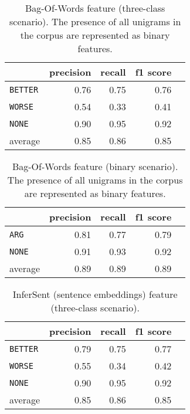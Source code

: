 \begin{table}[htbp] 
	\centering 
	\caption{Bag-Of-Words feature (three-class scenario). The presence of all unigrams in the corpus are represented as binary features.} 
	\begin{tabular}{@{}lrrrr@{}}
		\toprule
		                & precision & recall & f1 score \\ \midrule 
		\texttt{BETTER} & 0.76      & 0.75   & 0.76     \\ 
		\texttt{WORSE}  & 0.54      & 0.33   & 0.41     \\ 
		\texttt{NONE}   & 0.90      & 0.95   & 0.92     \\ 
		average         & 0.85      & 0.86   & 0.85     \\ 			\bottomrule
	\end{tabular}
\end{table}

\begin{table}[h] 
	\centering 
	\caption{Bag-Of-Words feature (binary scenario). The presence of all unigrams in the corpus are represented as binary features.} 
	\begin{tabular}{@{}lrrrr@{}}
		\toprule
		                & precision & recall & f1 score \\ \midrule 
		\texttt{ARG}    & 0.81      & 0.77   & 0.79     \\ 
		\texttt{NONE}   & 0.91      & 0.93   & 0.92     \\ 
		average         & 0.89      & 0.89   & 0.89     \\ 			\bottomrule
	\end{tabular}
\end{table}


\begin{table}[htbp] 
	\centering 
	\caption{InferSent (sentence embeddings) feature (three-class scenario).} 
	\begin{tabular}{@{}lrrrr@{}}
		\toprule
		                & precision & recall & f1 score \\ \midrule 
		\texttt{BETTER} & 0.79      & 0.75   & 0.77     \\ 
		\texttt{WORSE}  & 0.55      & 0.34   & 0.42     \\ 
		\texttt{NONE}   & 0.90      & 0.95   & 0.92     \\ 
		average         & 0.85      & 0.86   & 0.85     \\ 			\bottomrule
	\end{tabular}
\end{table}

